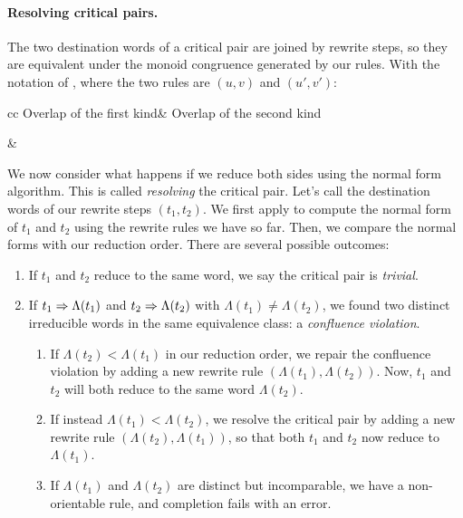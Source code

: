 \documentclass[../generics]{subfiles}
\begin{document}
\paragraph{Resolving critical pairs.}
The two destination words of a critical pair are joined by rewrite steps, so they are equivalent under the monoid congruence generated by our rules. With the notation of , where the two rules are $(u, v)$ and $(u', v')$:
\begin{center}
\begin{tabular}{cc}
Overlap of the first kind&
Overlap of the second kind\\
&
\end{tabular}
\end{center}
We now consider what happens if we reduce both sides using the normal form algorithm. This is called \emph{resolving} the critical pair. Let's call the destination words of our rewrite steps $(t_1, t_2)$. We first apply  to compute the normal form of $t_1$ and $t_2$ using the rewrite rules we have so far. Then, we compare the normal forms with our reduction order. There are several possible outcomes:
\begin{enumerate}
\item If $t_1$ and $t_2$ reduce to the same word, we say the critical pair is \emph{trivial}.
\item If $t_1\Rightarrow \Lambda(t_1)$ and $t_2\Rightarrow \Lambda(t_2)$ with $\Lambda(t_1)\neq \Lambda(t_2)$, we found two distinct irreducible words in the same equivalence class: a \emph{confluence violation}.

\begin{enumerate}
\item If $\Lambda(t_2) < \Lambda(t_1)$ in our reduction order, we repair the confluence violation by adding a new rewrite rule $(\Lambda(t_1), \Lambda(t_2))$. Now, $t_1$ and $t_2$ will both reduce to the same word $\Lambda(t_2)$.

\item If instead $\Lambda(t_1) < \Lambda(t_2)$, we resolve the critical pair by adding a new rewrite rule $(\Lambda(t_2), \Lambda(t_1))$, so that both $t_1$ and $t_2$ now reduce to $\Lambda(t_1)$.

\item If $\Lambda(t_1)$ and $\Lambda(t_2)$ are distinct but incomparable, we have a non-orientable rule, and completion fails with an error.
\end{enumerate}
\end{enumerate}
\end{document}
